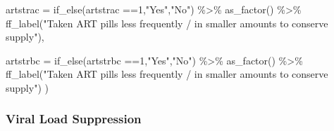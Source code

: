 \documentclass[
  letterpaper,
  DIV=11,
  numbers=noendperiod]{scrartcl}
\newenvironment{Shaded}{\begin{snugshade}}{\end{snugshade}}
\newcommand{\AttributeTok}[1]{\textcolor[rgb]{0.40,0.45,0.13}{#1}}
\newcommand{\DecValTok}[1]{\textcolor[rgb]{0.68,0.00,0.00}{#1}}
\newcommand{\FunctionTok}[1]{\textcolor[rgb]{0.28,0.35,0.67}{#1}}
\newcommand{\NormalTok}[1]{\textcolor[rgb]{0.00,0.23,0.31}{#1}}
\newcommand{\SpecialCharTok}[1]{\textcolor[rgb]{0.37,0.37,0.37}{#1}}
\newcommand{\StringTok}[1]{\textcolor[rgb]{0.13,0.47,0.30}{#1}}
\begin{document}
\begin{Shaded}
\begin{Highlighting}[]
  \AttributeTok{artstrac =} \FunctionTok{if\_else}\NormalTok{(artstrac }\SpecialCharTok{==}\DecValTok{1}\NormalTok{,}\StringTok{"Yes"}\NormalTok{,}\StringTok{"No"}\NormalTok{) }\SpecialCharTok{\%\textgreater{}\%} 
    \FunctionTok{as\_factor}\NormalTok{() }\SpecialCharTok{\%\textgreater{}\%} 
    \FunctionTok{ff\_label}\NormalTok{(}\StringTok{"Taken ART pills less frequently / in smaller}
\StringTok{amounts to conserve supply"}\NormalTok{),}
  
  \AttributeTok{artstrbc =} \FunctionTok{if\_else}\NormalTok{(artstrbc }\SpecialCharTok{==}\DecValTok{1}\NormalTok{,}\StringTok{"Yes"}\NormalTok{,}\StringTok{"No"}\NormalTok{) }\SpecialCharTok{\%\textgreater{}\%} 
    \FunctionTok{as\_factor}\NormalTok{() }\SpecialCharTok{\%\textgreater{}\%} 
    \FunctionTok{ff\_label}\NormalTok{(}\StringTok{"Taken ART pills less frequently / in smaller}
\StringTok{amounts to conserve supply"}\NormalTok{)}
\NormalTok{  )}
\end{Highlighting}
\end{Shaded}

\subsubsection{\texorpdfstring{\textbf{Viral Load
Suppression}}{Viral Load Suppression}}\label{viral-load-suppression}
\end{document}
